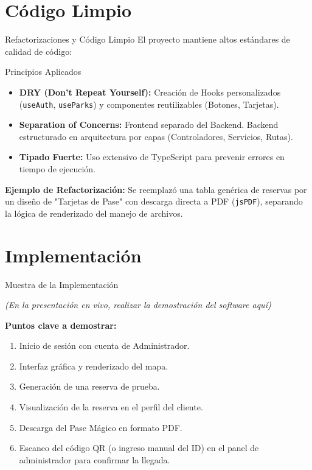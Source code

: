 \documentclass{beamer}
\begin{document}
\section{Código Limpio}
\begin{frame}{Refactorizaciones y Código Limpio}
  El proyecto mantiene altos estándares de calidad de código:
  \begin{block}{Principios Aplicados}
      \begin{itemize}
          \item \textbf{DRY (Don't Repeat Yourself):} Creación de Hooks personalizados (\texttt{useAuth}, \texttt{useParks}) y componentes reutilizables (Botones, Tarjetas).
          \item \textbf{Separation of Concerns:} Frontend separado del Backend. Backend estructurado en arquitectura por capas (Controladores, Servicios, Rutas).
          \item \textbf{Tipado Fuerte:} Uso extensivo de TypeScript para prevenir errores en tiempo de ejecución.
      \end{itemize}
  \end{block}
  \vspace{0.2cm}
  \textbf{Ejemplo de Refactorización:} 
  Se reemplazó una tabla genérica de reservas por un diseño de "Tarjetas de Pase" con descarga directa a PDF (\texttt{jsPDF}), separando la lógica de renderizado del manejo de archivos.
\end{frame}

\section{Implementación}
\begin{frame}{Muestra de la Implementación}
  \begin{center}
      \textit{(En la presentación en vivo, realizar la demostración del software aquí)}
  \end{center}
  \vspace{0.2cm}
  \textbf{Puntos clave a demostrar:}
  \begin{enumerate}
      \item Inicio de sesión con cuenta de Administrador.
      \item Interfaz gráfica y renderizado del mapa.
      \item Generación de una reserva de prueba.
      \item Visualización de la reserva en el perfil del cliente.
      \item Descarga del Pase Mágico en formato PDF.
      \item Escaneo del código QR (o ingreso manual del ID) en el panel de administrador para confirmar la llegada.
  \end{enumerate}
\end{frame}
\end{document}

